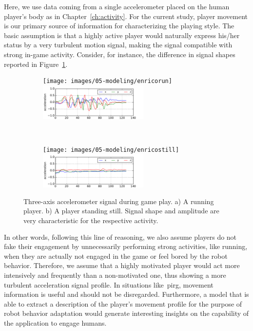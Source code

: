 Here, we use data coming from a single accelerometer placed on the human player's body as in Chapter~\ref{ch:activity}. For the current study, player movement is our primary source of information for characterizing the playing style. The basic assumption is that a highly active player would naturally express his/her status by a very turbulent motion signal, making the signal compatible with strong in-game activity. Consider, for instance, the difference in signal shapes reported in Figure~\ref{figure:acc_signal_shape}.

\begin{figure}[h]
    \centering
    \begin{subfigure}[h]{\textwidth}
        \centering
        \texttt{[image: images/05-modeling/enricorun]} 
        \includegraphics[width=0.6\textwidth]{images/05-modeling/running_sig_profile} 
        \caption{}
    \end{subfigure}\vspace{6pt}
    ~
    \begin{subfigure}[h]{\textwidth}
        \centering
        \texttt{[image: images/05-modeling/enricostill]}
        \includegraphics[width=0.6\textwidth]{images/05-modeling/standing_sig_profile} 
        \caption{}
    \end{subfigure} \vspace{-6pt}
    \caption{Three-axis accelerometer signal during game play. a) A running player. b) A player standing still. Signal shape and amplitude are very characteristic for the respective activity.}
    \label{figure:acc_signal_shape}
\end{figure} \unskip

In other words, following this line of reasoning, we also assume players do not fake their engagement by unnecessarily performing strong activities, like running, when they are actually not engaged in the game or feel bored by the robot behavior. Therefore, we assume that a highly motivated player would act more intensively and frequently than a non-motivated one, thus showing a more turbulent acceleration signal profile. In situations like~\gls{pirg}, movement information is useful and should not be disregarded. Furthermore, a model that is able to extract a description of the player's movement profile for the purpose of robot behavior adaptation would generate interesting insights on the capability of the application to engage humans.

